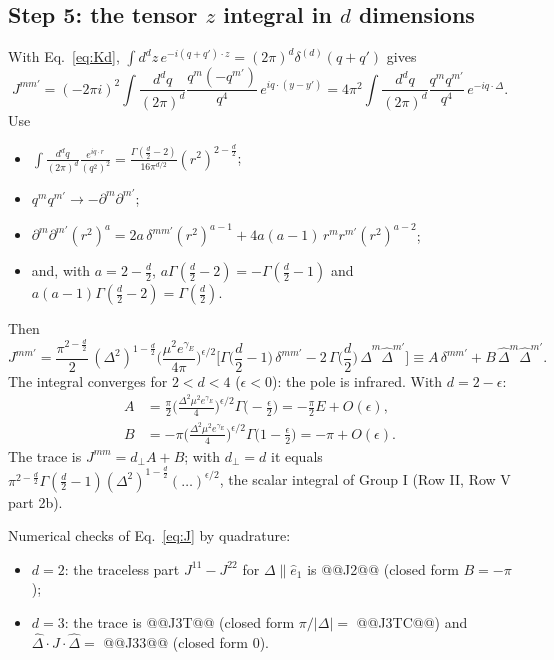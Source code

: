 \documentclass[10pt]{article}
\numberwithin{equation}{section}
\newcommand{\Dh}{\hat\Delta}
\begin{document}
\subsection{Step 5: the tensor \texorpdfstring{$z$}{z} integral in \texorpdfstring{$d$}{d} dimensions}\label{sec:J}
With Eq.~\eqref{eq:Kd}, $\int d^dz\,e^{-i(q+q')\cdot z}=(2\pi)^d\delta^{(d)}(q+q')$ gives
\begin{equation}
J^{mm'}=(-2\pi i)^2\int\frac{d^dq}{(2\pi)^d}\frac{q^m(-q^{m'})}{q^4}\,e^{iq\cdot(y-y')}=4\pi^2\int\frac{d^dq}{(2\pi)^d}\frac{q^mq^{m'}}{q^4}\,e^{-iq\cdot\Delta}.
\end{equation}
Use
\begin{itemize}
\item $\int\frac{d^dq}{(2\pi)^d}\frac{e^{iq\cdot r}}{(q^2)^2}=\frac{\Gamma(\frac d2-2)}{16\pi^{d/2}}(r^2)^{2-\frac d2}$;
\item $q^mq^{m'}\to-\partial^m\partial^{m'}$;
\item $\partial^m\partial^{m'}(r^2)^a=2a\,\delta^{mm'}(r^2)^{a-1}+4a(a-1)\,r^mr^{m'}(r^2)^{a-2}$;
\item and, with $a=2-\frac d2$, $a\Gamma(\frac d2-2)=-\Gamma(\frac d2-1)$ and $a(a-1)\Gamma(\frac d2-2)=\Gamma(\frac d2)$.
\end{itemize}
Then
\begin{equation}
J^{mm'}=\frac{\pi^{2-\frac d2}}{2}\,(\Delta^2)^{1-\frac d2}\Big(\frac{\mu^2e^{\gamma_E}}{4\pi}\Big)^{\epsilon/2}\Big[\Gamma\Big(\frac d2-1\Big)\,\delta^{mm'}-2\,\Gamma\Big(\frac d2\Big)\,\Dh^m\Dh^{m'}\Big]\equiv A\,\delta^{mm'}+B\,\Dh^m\Dh^{m'}.
\label{eq:J}
\end{equation}
The integral converges for $2<d<4$ ($\epsilon<0$): the pole is infrared. With $d=2-\epsilon$:
\begin{align}
A&=\frac{\pi}{2}\Big(\frac{\Delta^2\mu^2e^{\gamma_E}}{4}\Big)^{\epsilon/2}\Gamma\Big(-\frac\epsilon2\Big)=-\frac{\pi}{2}E+O(\epsilon),\\
B&=-\pi\Big(\frac{\Delta^2\mu^2e^{\gamma_E}}{4}\Big)^{\epsilon/2}\Gamma\Big(1-\frac\epsilon2\Big)=-\pi+O(\epsilon).
\end{align}
The trace is $J^{mm}=d_\perp A+B$; with $d_\perp=d$ it equals $\pi^{2-\frac d2}\Gamma(\frac d2-1)(\Delta^2)^{1-\frac d2}(\dots)^{\epsilon/2}$, the scalar integral of Group I (Row II, Row V part 2b).

Numerical checks of Eq.~\eqref{eq:J} by quadrature:
\begin{itemize}
\item $d=2$: the traceless part $J^{11}-J^{22}$ for $\Delta\parallel\hat e_1$ is @@J2@@ (closed form $B=-\pi$);
\item $d=3$: the trace is @@J3T@@ (closed form $\pi/|\Delta|=$ @@J3TC@@) and $\Dh\cdot J\cdot\Dh=$ @@J33@@ (closed form $0$).
\end{itemize}
\end{document}
